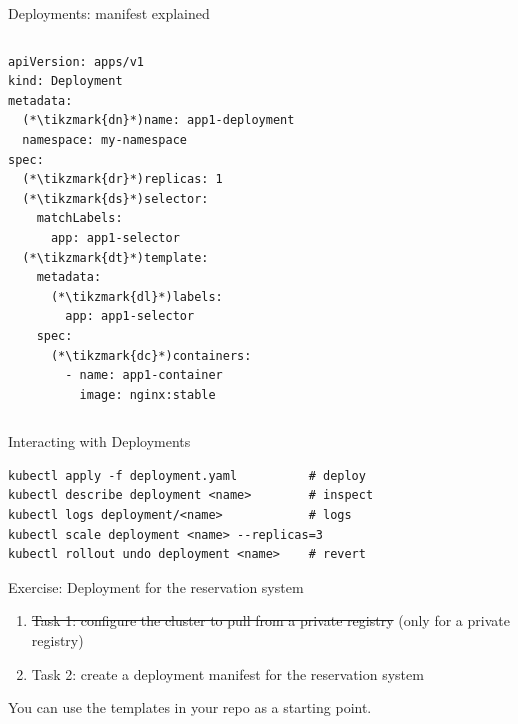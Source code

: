 \begin{frame}[fragile]{Deployments: manifest explained}
  \begin{columns}[T]
      \begin{yamlbox}
\begin{lstlisting}[style=wsyamlstyle, basicstyle=\ttfamily\scriptsize]
apiVersion: apps/v1
kind: Deployment
metadata:
  (*\tikzmark{dn}*)name: app1-deployment
  namespace: my-namespace
spec:
  (*\tikzmark{dr}*)replicas: 1
  (*\tikzmark{ds}*)selector:
    matchLabels:
      app: app1-selector
  (*\tikzmark{dt}*)template:
    metadata:
      (*\tikzmark{dl}*)labels:
        app: app1-selector
    spec:
      (*\tikzmark{dc}*)containers:
        - name: app1-container
          image: nginx:stable
\end{lstlisting}
      \end{yamlbox}
  \end{columns}
\end{frame}


\begin{frame}[fragile]{Interacting with Deployments}
  \begin{termbox}
\begin{lstlisting}[style=wstermstyle, basicstyle=\ttfamily\scriptsize\color{wsgreen}]
kubectl apply -f deployment.yaml          # deploy
kubectl describe deployment <name>        # inspect
kubectl logs deployment/<name>            # logs
kubectl scale deployment <name> --replicas=3
kubectl rollout undo deployment <name>    # revert
\end{lstlisting}
  \end{termbox}
\end{frame}

\begin{frame}{\exicon Exercise: Deployment for the reservation system}
  \begin{enumerate}
    \item \sout{Task 1: configure the cluster to pull from a private registry} (only for a private registry)
    \item Task 2: create a deployment manifest for the reservation system
  \end{enumerate}
  \bigskip You can use the templates in your repo as a starting point.
\end{frame}


